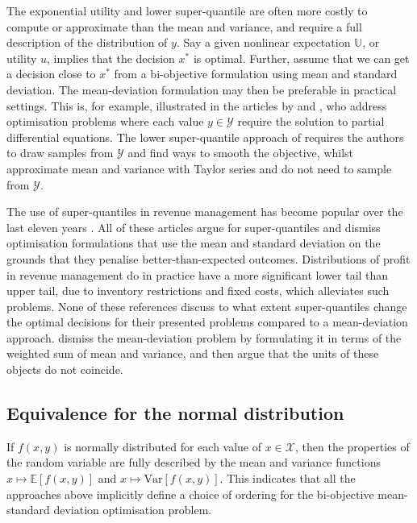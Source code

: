 \documentclass[main.tex]{subfiles}
\begin{document}
The exponential utility and lower super-quantile are often more costly
to compute or approximate than the mean and variance, and require a
full description of the distribution of $y$.
Say a given nonlinear expectation $\mathbb{U}$, or utility $u$,
implies that the decision $x^*$ is optimal. Further, assume that we can get a
decision close to $x^*$ from a bi-objective formulation using mean and standard
deviation. The mean-deviation formulation may then be preferable in
practical settings.
This is, for example, illustrated in the articles by
\citet{kouri2016risk} and \citet{alexanderian2017mean}, who address optimisation problems
where each value $y\in\mathcal{Y}$ require the solution to partial
differential equations.
The lower super-quantile approach of \citet{kouri2016risk}
requires the authors to draw samples from $\mathcal{Y}$ and find ways
to smooth the objective,
whilst \citet{alexanderian2017mean} approximate mean and variance
with Taylor series and do not need to sample from $\mathcal{Y}$.


The use of super-quantiles in revenue management has become popular
over the last eleven years
\citep{wu2014risk,xue2015optimal,zhou2008optimal,ahmed2007coherent}.
All of these articles argue for super-quantiles and dismiss
optimisation formulations that use the mean and standard deviation
on the grounds that they penalise better-than-expected outcomes.
Distributions of profit in revenue management do in practice
have a more significant lower tail than upper tail, due to inventory
restrictions and fixed costs, which alleviates such problems.
None of these references discuss to what extent super-quantiles change the
optimal decisions for their presented problems compared to a
mean-deviation approach. \citet{choi2011multiproduct}
dismiss the mean-deviation problem by formulating it in terms of the weighted sum of mean and
variance, and then argue that the units of these objects do not
coincide.


\subsection{Equivalence for the normal distribution}
If $f(x,y)$ is normally distributed for each value of
$x\in\mathcal{X}$, then the properties of the random variable are fully
described by the mean and variance functions $x\mapsto
\mathbb{E}[f(x,y)]$ and $x\mapsto \mbox{Var}[f(x,y)]$. This
indicates that all the approaches above implicitly define a
choice of ordering for the bi-objective mean-standard deviation
optimisation problem.
\end{document}
